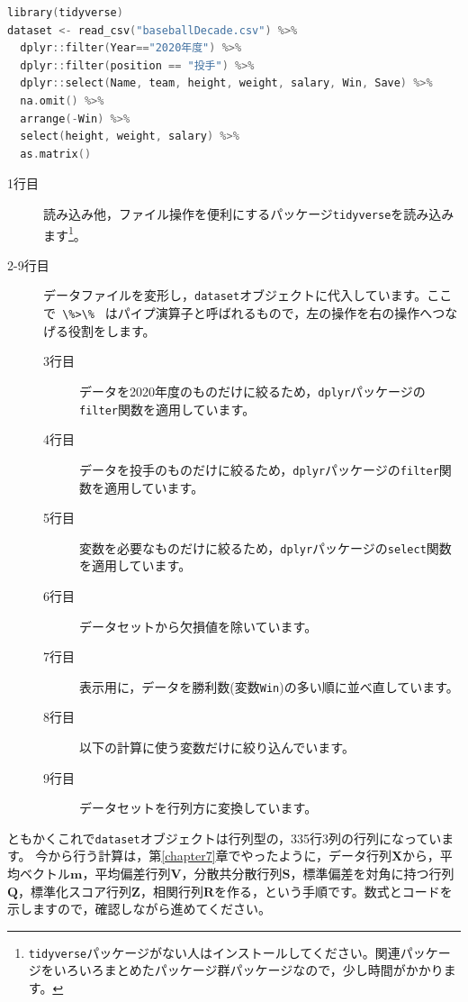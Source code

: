 \documentclass{ltjsbook}
\begin{document}
\begin{lstlisting}[language=c++,label={code::09_06},caption={データファイルの読み込み}]
library(tidyverse)
dataset <- read_csv("baseballDecade.csv") %>%
  dplyr::filter(Year=="2020年度") %>% 
  dplyr::filter(position == "投手") %>%
  dplyr::select(Name, team, height, weight, salary, Win, Save) %>%
  na.omit() %>%
  arrange(-Win) %>% 
  select(height, weight, salary) %>%
  as.matrix() 
\end{lstlisting}
\begin{description}
        \item[1行目] 読み込み他，ファイル操作を便利にするパッケージ\texttt{tidyverse}を読み込みます\footnote{\texttt{tidyverse}パッケージがない人はインストールしてください。関連パッケージをいろいろまとめたパッケージ群パッケージなので，少し時間がかかります。}。
        \item[2-9行目] データファイルを変形し，\texttt{dataset}オブジェクトに代入しています。ここで\verb| \%>\% | はパイプ演算子と呼ばれるもので，左の操作を右の操作へつなげる役割をします。
        \begin{description}
            \item[3行目] データを2020年度のものだけに絞るため，\verb|dplyr|パッケージの\verb|filter|関数を適用しています。
            \item[4行目] データを投手のものだけに絞るため，\verb|dplyr|パッケージの\verb|filter|関数を適用しています。
            \item[5行目] 変数を必要なものだけに絞るため，\verb|dplyr|パッケージの\verb|select|関数を適用しています。
            \item[6行目] データセットから欠損値を除いています。
            \item[7行目] 表示用に，データを勝利数(変数\verb|Win|)の多い順に並べ直しています。
            \item[8行目] 以下の計算に使う変数だけに絞り込んでいます。
            \item[9行目] データセットを行列方に変換しています。
        \end{description} 
\end{description}

ともかくこれで\texttt{dataset}オブジェクトは行列型の，335行3列の行列になっています。
今から行う計算は，第\ref{chapter7}章でやったように，データ行列$\bm{X}$から，平均ベクトル$\bm{m}$，平均偏差行列$\bm{V}$，分散共分散行列$\bm{S}$，標準偏差を対角に持つ行列$\bm{Q}$，標準化スコア行列$\bm{Z}$，相関行列$\bm{R}$を作る，という手順です。数式とコードを示しますので，確認しながら進めてください。
\end{document}
